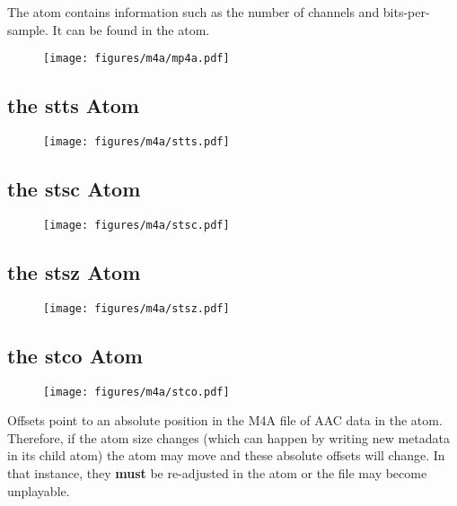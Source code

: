 The  atom contains information such as the number of channels
and bits-per-sample.  It can be found in the  atom.

\begin{figure}[h]
\texttt{[image: figures/m4a/mp4a.pdf]}
\end{figure}

\clearpage

\subsection{the stts Atom}

\begin{figure}[h]
\texttt{[image: figures/m4a/stts.pdf]}
\end{figure}

\subsection{the stsc Atom}

\begin{figure}[h]
\texttt{[image: figures/m4a/stsc.pdf]}
\end{figure}

\subsection{the stsz Atom}

\begin{figure}[h]
\texttt{[image: figures/m4a/stsz.pdf]}
\end{figure}

\clearpage

\subsection{the stco Atom}

\begin{figure}[h]
\texttt{[image: figures/m4a/stco.pdf]}
\end{figure}
\par
\noindent
Offsets point to an absolute position in the M4A file of AAC data in
the  atom.  Therefore, if the  atom size changes
(which can happen by writing new metadata in its  child atom)
the  atom may move and these absolute offsets will change.
In that instance, they \textbf{must}
be re-adjusted in the  atom or the file may become unplayable.

